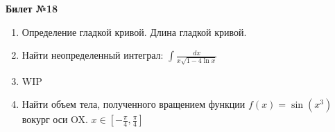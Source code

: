 \documentclass[a4paper, 12pt]{article}
\begin{document}
\begin{center}
	\textbf{Билет №18}
\end{center}
\begin{enumerate}
	\item Определение гладкой кривой. Длина гладкой кривой.
	\item Найти неопределенный интеграл: $\displaystyle \int{\frac{dx}{x \sqrt{1 - 4 \ln x}}}$
	\item WIP
	\item Найти объем тела, полученного вращением функции $f(x) = \sin(x^3)$ вокург оси OX. $x\in\left[-\frac{\pi}{4},\frac{\pi}{4}\right]$ 
\end{enumerate}
\end{document}
